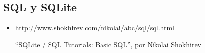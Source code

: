 \subsection{SQL y SQLite}


\begin{itemize}
\item \url{http://www.shokhirev.com/nikolai/abc/sql/sql.html}

``SQLite / SQL Tutorials: Basic SQL'', por Nikolai Shokhirev

\end{itemize}
